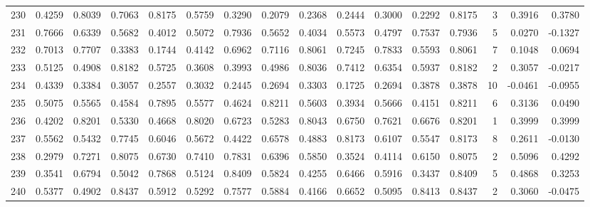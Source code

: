 \begin{tabular}{lrrrrrrrrrrrrrrr}
230 &      0.4259 &  0.8039 &  0.7063 &  0.8175 &  0.5759 &  0.3290 &  0.2079 &  0.2368 &  0.2444 &  0.3000 &   0.2292 &     0.8175 &      3 &                    0.3916 &                     0.3780 \\
231 &      0.7666 &  0.6339 &  0.5682 &  0.4012 &  0.5072 &  0.7936 &  0.5652 &  0.4034 &  0.5573 &  0.4797 &   0.7537 &     0.7936 &      5 &                    0.0270 &                    -0.1327 \\
232 &      0.7013 &  0.7707 &  0.3383 &  0.1744 &  0.4142 &  0.6962 &  0.7116 &  0.8061 &  0.7245 &  0.7833 &   0.5593 &     0.8061 &      7 &                    0.1048 &                     0.0694 \\
233 &      0.5125 &  0.4908 &  0.8182 &  0.5725 &  0.3608 &  0.3993 &  0.4986 &  0.8036 &  0.7412 &  0.6354 &   0.5937 &     0.8182 &      2 &                    0.3057 &                    -0.0217 \\
234 &      0.4339 &  0.3384 &  0.3057 &  0.2557 &  0.3032 &  0.2445 &  0.2694 &  0.3303 &  0.1725 &  0.2694 &   0.3878 &     0.3878 &     10 &                   -0.0461 &                    -0.0955 \\
235 &      0.5075 &  0.5565 &  0.4584 &  0.7895 &  0.5577 &  0.4624 &  0.8211 &  0.5603 &  0.3934 &  0.5666 &   0.4151 &     0.8211 &      6 &                    0.3136 &                     0.0490 \\
236 &      0.4202 &  0.8201 &  0.5330 &  0.4668 &  0.8020 &  0.6723 &  0.5283 &  0.8043 &  0.6750 &  0.7621 &   0.6676 &     0.8201 &      1 &                    0.3999 &                     0.3999 \\
237 &      0.5562 &  0.5432 &  0.7745 &  0.6046 &  0.5672 &  0.4422 &  0.6578 &  0.4883 &  0.8173 &  0.6107 &   0.5547 &     0.8173 &      8 &                    0.2611 &                    -0.0130 \\
238 &      0.2979 &  0.7271 &  0.8075 &  0.6730 &  0.7410 &  0.7831 &  0.6396 &  0.5850 &  0.3524 &  0.4114 &   0.6150 &     0.8075 &      2 &                    0.5096 &                     0.4292 \\
239 &      0.3541 &  0.6794 &  0.5042 &  0.7868 &  0.5124 &  0.8409 &  0.5824 &  0.4255 &  0.6466 &  0.5916 &   0.3437 &     0.8409 &      5 &                    0.4868 &                     0.3253 \\
240 &      0.5377 &  0.4902 &  0.8437 &  0.5912 &  0.5292 &  0.7577 &  0.5884 &  0.4166 &  0.6652 &  0.5095 &   0.8413 &     0.8437 &      2 &                    0.3060 &                    -0.0475 \\

\end{tabular}
